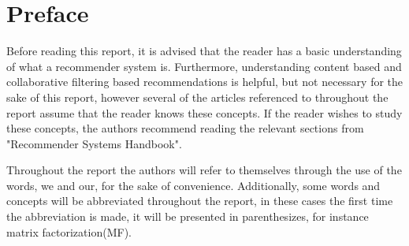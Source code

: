 \chapter*{Preface}
Before reading this report, it is advised that the reader has a basic understanding of what a recommender system is. Furthermore, understanding content based and collaborative filtering based recommendations is helpful, but not necessary for the sake of this report, however several of the articles referenced to throughout the report assume that the reader knows these concepts. If the reader wishes to study these concepts, the authors recommend reading the relevant sections from "Recommender Systems Handbook"\cite{recsyshandbook}.

Throughout the report the authors will refer to themselves through the use of the words, we and our, for the sake of convenience. Additionally, some words and concepts will be abbreviated throughout the report, in these cases the first time the abbreviation is made, it will be presented in parenthesizes, for instance matrix factorization(MF).

%
